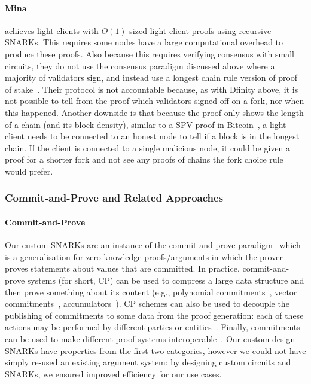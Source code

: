 \paragraph{Mina} achieves light clients with $O(1)$ sized light client proofs using recursive SNARKs. This requires some nodes have a large 
computational overhead to produce these proofs. Also because this requires verifying consensus with small circuits, they do not use the consensus 
paradigm discussed above where a majority of validators sign, and instead use a longest chain rule version of proof of stake~\cite{mina}. 
Their protocol is not accountable because, as with Dfinity above, it is not possible to tell from the proof which validators signed off on a fork, 
nor when this happened. Another downside is that because the proof only shows the length of a chain (and its block density), similar to a SPV 
proof in Bitcoin~\cite{bitcoin}, a light client needs to be connected to an honest node to tell if a block is in the longest chain. If the client is connected 
to a single malicious node, it could be given a proof for a shorter fork and not see any proofs of chains the fork choice rule would prefer.
\subsubsection{Commit-and-Prove and Related Approaches}
\label{sec:commit_prove}

\paragraph{Commit-and-Prove} Our custom SNARKs are an instance of the commit-and-prove paradigm~\cite{KilianPhD,CLOS02,CP_proposal,HP_paper} 
which is a generalisation for zero-knowledge proofs/arguments in which the prover proves statements about values that are committed. 
In practice, commit-and-prove systems (for short, CP) can be used to compress a large data structure and then prove something about its content 
(e.g., polynomial commitments~\cite{KZG_10}, vector commitments~\cite{vector_commitment_1}, accumulators~\cite{first_accumulator}). CP schemes 
can also be used to decouple the publishing of commitments to some data from the proof generation: each of these actions may be performed by different 
parties or entities~\cite{zkp_reference}. Finally, commitments can be used to make different proof systems interoperable~\cite{CP_paper,interoperability_2}. 
Our custom design SNARKs have properties from the first two categories, however we could not have simply re-used an existing argument system: by 
designing custom circuits and SNARKs, we ensured improved efficiency for our use cases. \\
\vspace{-0.2cm}
